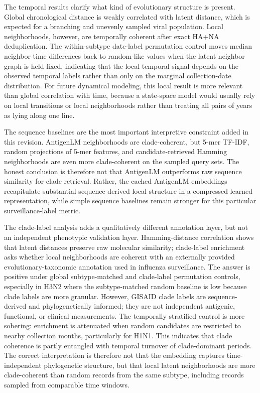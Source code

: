 \documentclass[11pt]{article}
\begin{document}
The temporal results clarify what kind of evolutionary structure is present. Global chronological distance is weakly correlated with latent distance, which is expected for a branching and unevenly sampled viral population. Local neighborhoods, however, are temporally coherent after exact HA+NA deduplication. The within-subtype date-label permutation control moves median neighbor time differences back to random-like values when the latent neighbor graph is held fixed, indicating that the local temporal signal depends on the observed temporal labels rather than only on the marginal collection-date distribution. For future dynamical modeling, this local result is more relevant than global correlation with time, because a state-space model would usually rely on local transitions or local neighborhoods rather than treating all pairs of years as lying along one line.

The sequence baselines are the most important interpretive constraint added in this revision. AntigenLM neighborhoods are clade-coherent, but 5-mer TF-IDF, random projections of 5-mer features, and candidate-retrieved Hamming neighborhoods are even more clade-coherent on the sampled query sets. The honest conclusion is therefore not that AntigenLM outperforms raw sequence similarity for clade retrieval. Rather, the cached AntigenLM embeddings recapitulate substantial sequence-derived local structure in a compressed learned representation, while simple sequence baselines remain stronger for this particular surveillance-label metric.

The clade-label analysis adds a qualitatively different annotation layer, but not an independent phenotypic validation layer. Hamming-distance correlation shows that latent distances preserve raw molecular similarity; clade-label enrichment asks whether local neighborhoods are coherent with an externally provided evolutionary-taxonomic annotation used in influenza surveillance. The answer is positive under global subtype-matched and clade-label permutation controls, especially in H3N2 where the subtype-matched random baseline is low because clade labels are more granular. However, GISAID clade labels are sequence-derived and phylogenetically informed; they are not independent antigenic, functional, or clinical measurements. The temporally stratified control is more sobering: enrichment is attenuated when random candidates are restricted to nearby collection months, particularly for H1N1. This indicates that clade coherence is partly entangled with temporal turnover of clade-dominant periods. The correct interpretation is therefore not that the embedding captures time-independent phylogenetic structure, but that local latent neighborhoods are more clade-coherent than random records from the same subtype, including records sampled from comparable time windows.
\end{document}
